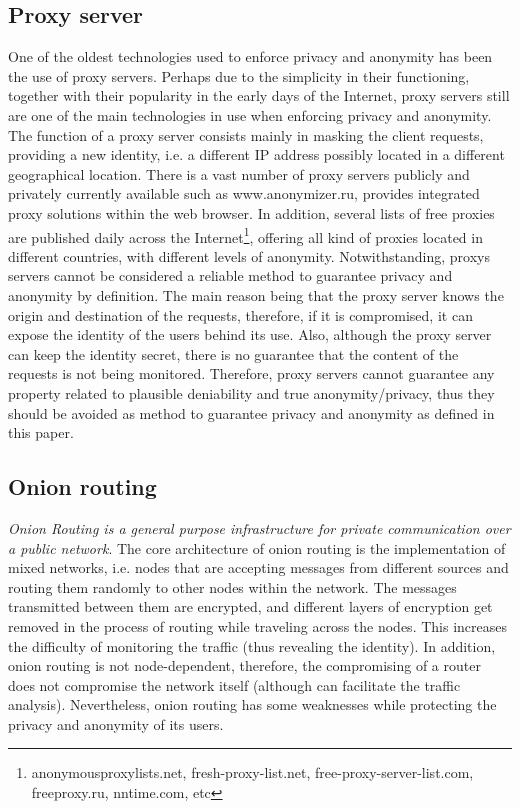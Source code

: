 \documentclass[conference]{IEEEtran}
\begin{document}
\subsection{Proxy server}

One of the oldest technologies used to enforce privacy and anonymity has been the use of proxy servers. Perhaps due to the simplicity in their functioning, together with their popularity in the early days of the Internet, proxy servers still are one of the main technologies in use when enforcing privacy and anonymity.
The function of a proxy server consists mainly in masking the client requests, providing a new identity, i.e. a different IP address possibly located in a different geographical location. There is a vast number of proxy servers publicly and privately currently available such as www.anonymizer.ru, provides integrated proxy solutions within the web browser. In addition, several lists of free proxies are published daily across the Internet\footnote{anonymousproxylists.net, fresh-proxy-list.net, free-proxy-server-list.com, freeproxy.ru, nntime.com, etc}, offering all kind of proxies located in different countries, with different levels of anonymity. Notwithstanding, proxys servers cannot be considered a reliable method to guarantee privacy and anonymity by definition. The main reason being that the proxy server knows the origin and destination of the requests, therefore, if it is compromised, it can expose the identity of the users behind its use\cite{averview}. Also, although the proxy server can keep the identity secret, there is no guarantee that the content of the requests is not being monitored. Therefore, proxy servers cannot guarantee any property related to plausible deniability and true anonymity/privacy, thus they should be avoided as method to guarantee privacy and anonymity as defined in this paper.

\subsection{Onion routing}

\textit{Onion Routing is a general purpose infrastructure for private communication
over a public network\cite{ONION}}. The core architecture of onion routing is the implementation of mixed networks, i.e. nodes that are accepting messages from different sources and routing them randomly to other nodes within the network. The messages transmitted between them are encrypted, and different layers of encryption get removed in the process of routing while traveling across the nodes\cite{ONION}. This increases the difficulty of monitoring the traffic (thus revealing the identity). In addition, onion routing is not node-dependent, therefore, the compromising of a router does not compromise the network itself (although can facilitate the traffic analysis). Nevertheless, onion routing has some weaknesses while protecting the privacy and anonymity of its users.
\end{document}
